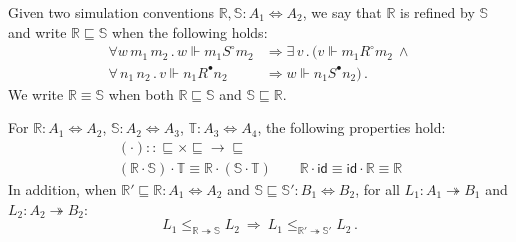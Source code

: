 \documentclass[sigplan,10pt,review]{acmart}
\newcommand{\kw}[1]{\ensuremath{ \mathsf{#1} }}
\newcommand{\que}{\circ}
\newcommand{\ans}{\bullet}
\newcommand{\screfd}{\sqsubseteq}
\begin{document}
\begin{definition} %
Given two simulation conventions
$\mathbb{R}, \mathbb{S} : A_1 \Leftrightarrow A_2$,
we say that
$\mathbb{R}$ is refined by $\mathbb{S}$ and write
$\mathbb{R} \screfd \mathbb{S}$
when the following holds:
\begin{align*}
  \forall w \, m_1 \, m_2 \,.\,
  w \Vdash m_1 \mathrel{S^\que} m_2 &\Rightarrow
  \exists \, v \,.\, (
  v \Vdash m_1 \mathrel{R^\que} m_2
  \: \wedge \\
  \forall \, n_1 \, n_2 \,.\,
  v \Vdash n_1 \mathrel{R^\ans} n_2 &\Rightarrow
  w \Vdash n_1 \mathrel{S^\ans} n_2) \,.
\end{align*}
We write $\mathbb{R} \equiv \mathbb{S}$ when both
$\mathbb{R} \screfd \mathbb{S}$ and
$\mathbb{S} \screfd \mathbb{R}$.
\end{definition}

\begin{theorem} \label{thm:sccomp} %
For
$\mathbb{R} : A_1 \Leftrightarrow A_2$,
$\mathbb{S} : A_2 \Leftrightarrow A_3$,
$\mathbb{T} : A_3 \Leftrightarrow A_4$,
the following properties hold:
\begin{gather*}
  ({\cdot}) :: {{\screfd} \times {\screfd} \rightarrow {\screfd}}
  \\
  (\mathbb{R} \cdot \mathbb{S}) \cdot \mathbb{T} \equiv
    \mathbb{R} \cdot (\mathbb{S} \cdot \mathbb{T})
  \qquad
  \mathbb{R} \cdot \kw{id} \equiv
  \kw{id} \cdot \mathbb{R} \equiv
  \mathbb{R}
\end{gather*}
In addition, when
$\mathbb{R}' \screfd \mathbb{R} : A_1 \Leftrightarrow A_2$ and
$\mathbb{S} \screfd \mathbb{S}' : B_1 \Leftrightarrow B_2$,
for all
$L_1 : A_1 \twoheadrightarrow B_1$ and $L_2 : A_2 \twoheadrightarrow B_2$:
\[
      L_1 \le_{\mathbb{R} \twoheadrightarrow \mathbb{S}} L_2
      \: \Rightarrow \:
      L_1 \le_{\mathbb{R}' \twoheadrightarrow \mathbb{S}'} L_2 \,.
\]
\end{theorem}
\end{document}
